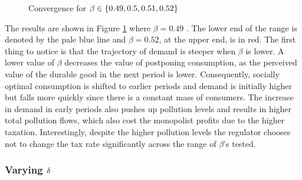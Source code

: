 \begin{figure}[]
{    \label{fig:conv_Beta_welfare}
  }
\caption{Convergence for $\protect\beta \in \{0.49, 0.5, 0.51, 0.52\}$}
\label{fig:conv_beta_plots}
\end{figure}

The results are shown in Figure \ref{fig:conv_beta_plots} where $\beta =0.49$%
. The lower end of the range is denoted by the pale blue line and $\beta
=0.52$, at the upper end, is in red. The first thing to notice is that the
trajectory of demand is steeper when $\beta $ is lower. A lower value of $%
\beta $ decreases the value of postponing consumption, as the perceived
value of the durable good in the next period is lower. Consequently,
socially optimal consumption is shifted to earlier periods and demand is
initially higher but falls more quickly since there is a constant mass of
consumers. The increase in demand in early periods also pushes up pollution
levels and results in higher total pollution flows, which also cost the
monopolist profits due to the higher taxation. Interestingly, despite the
higher pollution levels the regulator chooses not to change the tax rate
significantly across the range of $\beta $'s tested.

\subsubsection{Varying $\protect\delta$}

\label{sec:varying-delta}

